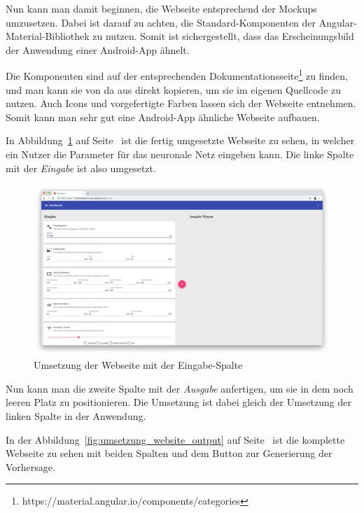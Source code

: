 Nun kann man damit beginnen, die Webseite entsprechend der Mockups umzusetzen. Dabei ist darauf zu achten, die
Standard-Komponenten der Angular-Material-Bibliothek zu nutzen. Somit ist sichergestellt, dass das Erscheinungsbild der
Anwendung einer Android-App ähnelt.

Die Komponenten sind auf der entsprechenden
Dokumentationsseite\footnote{https://material.angular.io/components/categories} zu finden, und man kann sie von da aus
direkt kopieren, um sie im eigenen Quellcode zu nutzen. Auch Icons und vorgefertigte Farben lassen sich der Webseite
entnehmen. Somit kann man sehr gut eine Android-App ähnliche Webseite aufbauen.

In Abbildung~\ref{fig:umsetzung_website_input} auf Seite~\pageref{fig:umsetzung_website_input} ist die fertig
umgesetzte Webseite zu sehen, in welcher ein Nutzer die Parameter für das neuronale Netz eingeben kann. Die linke Spalte
mit der \textit{Eingabe} ist also umgesetzt.

\begin{figure}[h]
    \centering
    \includegraphics[width=\textwidth]{images/kapitel_4/website_input.png}
    \caption{Umsetzung der Webseite mit der Eingabe-Spalte}
    \label{fig:umsetzung_website_input}
\end{figure}

Nun kann man die zweite Spalte mit der \textit{Ausgabe} anfertigen, um sie in dem noch leeren Platz zu positionieren. Die
Umsetzung ist dabei gleich der Umsetzung der linken Spalte in der Anwendung.

In der Abbildung~\ref{fig:umsetzung_website_output} auf Seite~\pageref{fig:umsetzung_website_output} ist die komplette
Webseite zu sehen mit beiden Spalten und dem Button zur Generierung der Vorhersage.

